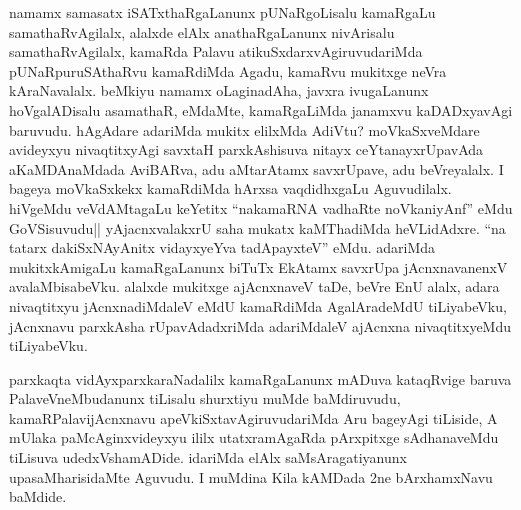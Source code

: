 
\begin{artha}
namamx samasatx iSATxthaRgaLanunx pUNaRgoLisalu kamaRgaLu samathaRvAgilalx, alalxde elAlx anathaRgaLanunx nivArisalu samathaRvAgilalx, kamaRda Palavu atikuSxdarxvAgiruvudariMda pUNaRpuruSAthaRvu kamaRdiMda Agadu, kamaRvu mukitxge neVra kAraNavalalx. beMkiyu namamx oLaginadAha, javxra ivugaLanunx hoVgalADisalu asamathaR, eMdaMte, kamaRgaLiMda janamxvu kaDADxyavAgi baruvudu. hAgAdare adariMda mukitx elilxMda AdiVtu? moVkaSxveMdare avideyxyu nivaqtitxyAgi savxtaH parxkAshisuva nitayx ceYtanayxrUpavAda aKaMDAnaMdada AviBARva, adu aMtarAtamx savxrUpave, adu beVreyalalx. I bageya moVkaSxkekx kamaRdiMda hArxsa vaqdidhxgaLu Aguvudilalx. hiVgeMdu veVdAMtagaLu keYetitx ``nakamaRNA vadhaRte noVkaniyAnf'' eMdu GoVSisuvudu|| yAjacnxvalakxrU saha mukatx kaMThadiMda heVLidAdxre. ``na tatarx dakiSxNAyAnitx vidayxyeYva tadApayxteV'' eMdu. adariMda mukitxkAmigaLu kamaRgaLanunx biTuTx EkAtamx savxrUpa jAcnxnavanenxV avalaMbisabeVku. alalxde mukitxge ajAcnxnaveV taDe, beVre EnU alalx, adara nivaqtitxyu jAcnxnadiMdaleV eMdU kamaRdiMda AgalAradeMdU tiLiyabeVku, jAcnxnavu parxkAsha rUpavAdadxriMda adariMdaleV ajAcnxna nivaqtitxyeMdu tiLiyabeVku.
\end{artha}

\begin{artha}
parxkaqta vidAyxparxkaraNadalilx kamaRgaLanunx mADuva kataqRvige baruva PalaveVneMbudanunx tiLisalu shurxtiyu muMde baMdiruvudu, kamaRPalavijAcnxnavu apeVkiSxtavAgiruvudariMda Aru bageyAgi tiLiside, A mUlaka paMcAginxvideyxyu ililx utatxramAgaRda pArxpitxge sAdhanaveMdu tiLisuva udedxVshamADide. idariMda elAlx saMsAragatiyanunx upasaMharisidaMte Aguvudu. I muMdina Kila kAMDada 2ne bArxhamxNavu baMdide.
\end{artha}

